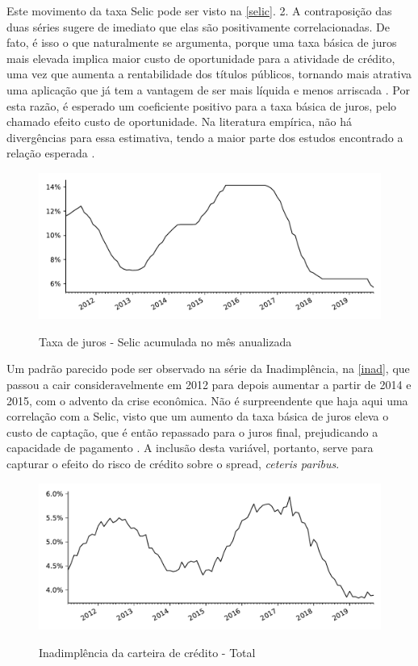 \documentclass[a4paper,
               article,
               12pt,
               openany,
               oneside,
               english,
               brazil]{abntex2}
\numberwithin{equation}{section}
\begin{document}
    Este movimento da taxa Selic pode ser visto na \autoref{selic}. 2. A contraposição das duas séries sugere de imediato que elas são positivamente correlacionadas. De fato, é isso o que naturalmente se argumenta, porque uma taxa básica de juros mais elevada implica maior custo de oportunidade para a atividade de crédito, uma vez que aumenta a rentabilidade dos títulos públicos, tornando mais atrativa uma aplicação que já tem a vantagem de ser mais líquida e menos arriscada \cite[p.~372]{oliveira2007}. Por esta razão, é esperado um coeficiente positivo para a taxa básica de juros, pelo chamado efeito custo de oportunidade. Na literatura empírica, não há divergências para essa estimativa, tendo a maior parte dos estudos encontrado a relação esperada \cite[p.~233-234]{leal07}.

    \begin{figure}[h]
        \centering
        \caption{Taxa de juros - Selic acumulada no mês anualizada}
        \includegraphics[width = \textwidth, scale=0.75]{selic.pdf}
        \label{selic}
    \end{figure}

    Um padrão parecido pode ser observado na série da Inadimplência, na \autoref{inad}, que passou a cair consideravelmente em 2012 para depois aumentar a partir de 2014 e 2015, com o advento da crise econômica. Não é surpreendente que haja aqui uma correlação com a Selic, visto que um aumento da taxa básica de juros eleva o custo de captação, que é então repassado para o juros final, prejudicando a capacidade de pagamento \cite[p.~390]{oliveira2007}. A inclusão desta variável, portanto, serve para capturar o efeito do risco de crédito sobre o spread, \textit{ceteris paribus}.

    \begin{figure}[htb]
        \centering
        \caption{Inadimplência da carteira de crédito - Total}
        \includegraphics[width = \textwidth, scale=0.75]{inad.pdf}
        \label{inad}
    \end{figure}
\end{document}
